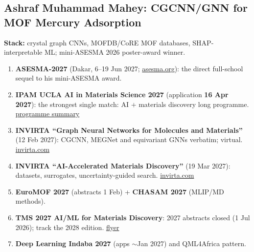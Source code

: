 \documentclass[11pt,a4paper]{article}
\begin{document}
\subsection{Ashraf Muhammad Mahey: CGCNN/GNN for MOF Mercury Adsorption}
\textbf{Stack:} crystal graph CNNs, MOFDB/CoRE MOF databases, SHAP-interpretable ML; mini-ASESMA 2026 poster-award winner.
\begin{enumerate}[leftmargin=1.6em]
  \item \textbf{ASESMA-2027} (Dakar, 6--19 Jun 2027; \href{https://asesma.org/programs}{asesma.org}): the direct full-school sequel to his mini-ASESMA award.
  \item \textbf{IPAM UCLA AI in Materials Science 2027} (application \textbf{16 Apr 2027}): the strongest single match: AI $+$ materials discovery long programme. \href{https://atomgrants.com/grant/artificial-intelligence-materials-science-institute-for-pure-and-applied-mathematics}{programme summary}
  \item \textbf{INVIRTA ``Graph Neural Networks for Molecules and Materials''} (12 Feb 2027): CGCNN, MEGNet and equivariant GNNs verbatim; virtual. \href{https://www.invirta.com/workshops/am/workshop-5-5}{invirta.com}
  \item \textbf{INVIRTA ``AI-Accelerated Materials Discovery''} (19 Mar 2027): datasets, surrogates, uncertainty-guided search. \href{https://www.invirta.com/workshops/am/workshop-5-10}{invirta.com}
  \item \textbf{EuroMOF 2027} (abstracts 1 Feb) + \textbf{CHASAM 2027} (MLIP/MD methods).
  \item \textbf{TMS 2027 AI/ML for Materials Discovery}: 2027 abstracts closed (1 Jul 2026); track the 2028 edition. \href{https://www.tms.org/tms2027/downloads/flyers/TMS2027-CFA-Flyer-022.pdf}{flyer}
  \item \textbf{Deep Learning Indaba 2027} (apps $\sim$Jan 2027) and QML4Africa pattern.
\end{enumerate}
\end{document}
